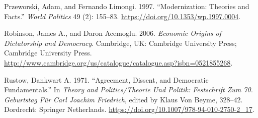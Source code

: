 \documentclass[12pt,]{article}
\begin{document}
\leavevmode\hypertarget{ref-przeworski}{}%
Przeworski, Adam, and Fernando Limongi. 1997. ``Modernization: Theories
and Facts.'' \emph{World Politics} 49 (2): 155--83.
\url{https://doi.org/10.1353/wp.1997.0004}.

\leavevmode\hypertarget{ref-robinson}{}%
Robinson, James A., and Daron Acemoglu. 2006. \emph{Economic Origins of
Dictatorship and Democracy}. Cambridge, UK: Cambridge University Press;
Cambridge University Press.
\url{http://www.cambridge.org/us/catalogue/catalogue.asp?isbn=0521855268}.

\leavevmode\hypertarget{ref-rustow}{}%
Rustow, Dankwart A. 1971. ``Agreement, Dissent, and Democratic
Fundamentals.'' In \emph{Theory and Politics/Theorie Und Politik:
Festschrift Zum 70. Geburtstag Für Carl Joachim Friedrich}, edited by
Klaus Von Beyme, 328--42. Dordrecht: Springer Netherlands.
\url{https://doi.org/10.1007/978-94-010-2750-2_17}.





\newpage
\singlespacing 
\end{document}
